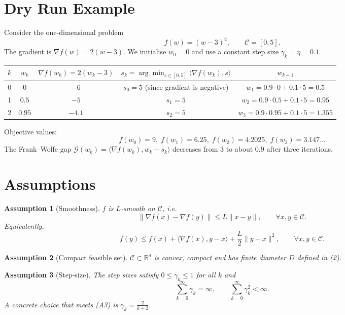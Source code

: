 \documentclass{article}
\newtheorem{assumption}{Assumption}
\newcommand{\R}{\mathbb{R}}
\begin{document}
\section*{Dry Run Example}
Consider the one‑dimensional problem
\[
f(w)=(w-3)^2 ,\qquad \mathcal C=[0,5] .
\]
The gradient is $\nabla f(w)=2(w-3)$.  
We initialise $w_0=0$ and use a constant step size $\gamma_k=\eta=0.1$.

\begin{center}
\begin{tabular}{c|c|c|c|c}
$k$ & $w_k$ & $\nabla f(w_k)=2(w_k-3)$ & $s_k=\arg\min_{s\in[0,5]}\langle\nabla f(w_k),s\rangle$ & $w_{k+1}$ \\ \hline
0 & $0$ & $-6$ & $s_0=5$ (since gradient is negative) & $w_1=0.9\cdot0+0.1\cdot5=0.5$ \\
1 & $0.5$ & $-5$ & $s_1=5$ & $w_2=0.9\cdot0.5+0.1\cdot5=0.95$ \\
2 & $0.95$ & $-4.1$ & $s_2=5$ & $w_3=0.9\cdot0.95+0.1\cdot5=1.355$ 
\end{tabular}
\end{center}
Objective values:
\[
f(w_0)=9,\; f(w_1)=6.25,\; f(w_2)=4.2025,\; f(w_3)=3.147\ldots
\]
The Frank–Wolfe gap $\mathcal G(w_k)=\langle\nabla f(w_k),w_k-s_k\rangle$ decreases from $3$ to about $0.9$ after three iterations.

\newpage
\section*{Assumptions}
\begin{assumption}[Smoothness] \label{ass:smooth}
$f$ is $L$‑smooth on $\mathcal C$, i.e.
\[
\|\nabla f(x)-\nabla f(y)\|\le L\|x-y\|,\qquad\forall x,y\in\mathcal C .
\tag{A1}
\]
Equivalently,
\[
f(y)\le f(x)+\langle\nabla f(x),y-x\rangle+\frac{L}{2}\|y-x\|^{2},
\qquad\forall x,y\in\mathcal C .
\tag{A1'}
\]
\end{assumption}

\begin{assumption}[Compact feasible set] \label{ass:compact}
$\mathcal C\subset\R^{d}$ is convex, compact and has finite diameter $D$ defined in (2).
\end{assumption}

\begin{assumption}[Step‑size] \label{ass:stepsize}
The step sizes satisfy $0\le\gamma_k\le 1$ for all $k$ and
\[
\sum_{k=0}^{\infty}\gamma_k =\infty,\qquad
\sum_{k=0}^{\infty}\gamma_k^{2}<\infty .
\tag{A3}
\]
A concrete choice that meets (A3) is $\gamma_k = \frac{2}{k+2}$.
\end{assumption}
\end{document}
